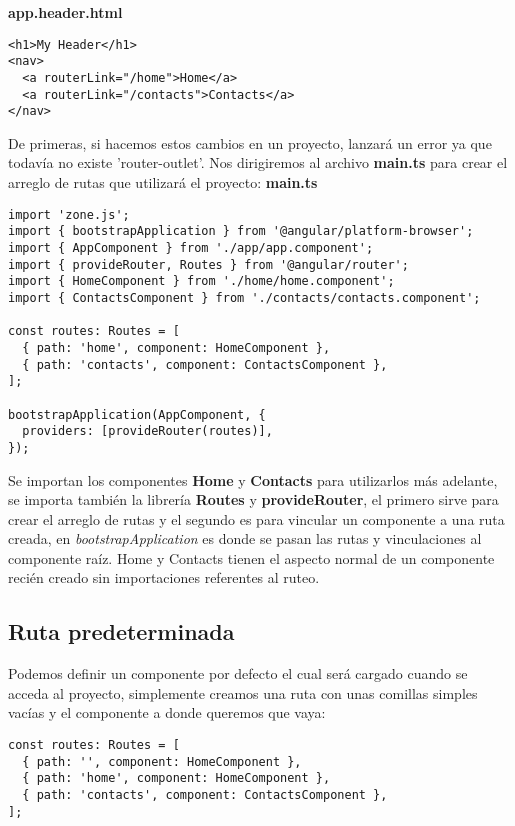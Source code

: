 \textbf{app.header.html}
\begin{lstlisting}[style=htmlcssjs]
<h1>My Header</h1>
<nav>
  <a routerLink="/home">Home</a>
  <a routerLink="/contacts">Contacts</a>
</nav>

\end{lstlisting}

De primeras, si hacemos estos cambios en un proyecto, lanzará un error ya que todavía no existe 'router-outlet'. Nos dirigiremos al archivo \textbf{main.ts} para crear el arreglo de rutas que utilizará el proyecto:
\textbf{main.ts}
\begin{lstlisting}[style=htmlcssjs]
import 'zone.js';
import { bootstrapApplication } from '@angular/platform-browser';
import { AppComponent } from './app/app.component';
import { provideRouter, Routes } from '@angular/router';
import { HomeComponent } from './home/home.component';
import { ContactsComponent } from './contacts/contacts.component';

const routes: Routes = [
  { path: 'home', component: HomeComponent },
  { path: 'contacts', component: ContactsComponent },
];

bootstrapApplication(AppComponent, {
  providers: [provideRouter(routes)],
});
\end{lstlisting}

Se importan los componentes \textbf{Home} y \textbf{Contacts} para utilizarlos más adelante, se importa también la librería \textbf{Routes} y \textbf{provideRouter}, el primero sirve para crear el arreglo de rutas y el segundo es para vincular un componente a una ruta creada, en \textit{bootstrapApplication} es donde se pasan las rutas y vinculaciones al componente raíz. Home y Contacts tienen el aspecto normal de un componente recién creado sin importaciones referentes al ruteo.


\subsection{Ruta predeterminada}

Podemos definir un componente por defecto el cual será cargado cuando se acceda al proyecto, simplemente creamos una ruta con unas comillas simples vacías y el componente a donde queremos que vaya:
\begin{lstlisting}[style=htmlcssjs]
const routes: Routes = [
  { path: '', component: HomeComponent },
  { path: 'home', component: HomeComponent },
  { path: 'contacts', component: ContactsComponent },
];
\end{lstlisting}


